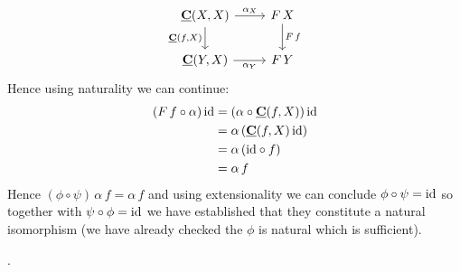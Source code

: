 \[\begin{tikzcd}
\cat{C}(X,X) \arrow[r,"\alpha_X"] \arrow[d,"\homC{C}{f}{X}" left] & F\,X \arrow[d,"F\,f"]\\
\cat{C}(Y,X) \arrow[r,"\alpha_Y" below] & F\,Y
\end{tikzcd}\]
Hence using naturality we can continue:
\begin{align*}
(F\, f \circ \alpha)\,\mathrm{id}
& = (\alpha \circ \underline{\mathbf{C}}(f,X))\,\mathrm{id} \\
& = \alpha\,(\underline{\mathbf{C}}(f,X)\,\mathrm{id}) \\
& = \alpha\,(\mathrm{id} \circ f) \\
& = \alpha\,f
\end{align*}
Hence $(\phi \circ \psi)\,\alpha\,f = \alpha\,f$ and using extensionality we can conclude $\phi\circ\psi = \mathrm{id}$ so together with $\psi\circ\phi = \mathrm{id}$ we have established that they constitute a natural isomorphism (we have already checked the $\phi$ is natural which is sufficient).

.%


